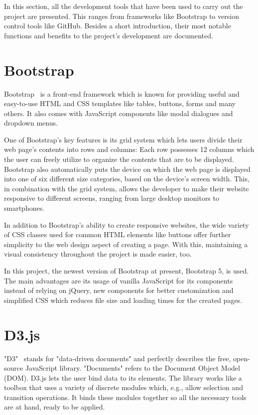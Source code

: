 
In this section, all the development tools that have been used to carry out the project are presented. This ranges from frameworks like Bootstrap to version control tools like GitHub. Besides a short introduction, their most notable functions and benefits to the project's development are documented.

\section{Bootstrap}
Bootstrap~\cite{bootstrap5_tutorial} is a front-end framework which is known for providing useful and easy-to-use HTML and CSS templates like tables, buttons, forms and many others. It also comes with JavaScript components like modal dialogues and dropdown menus.

One of Bootstrap's key features is its grid system which lets users divide their web page's contents into rows and columns:
Each row possesses 12 columns which the user can freely utilize to organize the contents that are to be displayed. Bootstrap also automatically puts the device on which the web page is displayed into one of six different size categories, based on the device's screen width. This, in combination with the grid system, allows the developer to make their website responsive to different screens, ranging from large desktop monitors to smartphones.

In addition to Bootstrap's ability to create responsive websites, the wide variety of CSS classes used for common HTML elements like buttons offer further simplicity to the web design aspect of creating a page. With this, maintaining a visual consistency throughout the project is made easier, too.

In this project, the newest version of Bootstrap at present, Bootstrap 5, is used. The main advantages are its usage of vanilla JavaScript for its components instead of relying on jQuery, new components for better customization and simplified CSS which reduces file size and loading times for the created pages.

\section{D3.js}
"D3"~\cite{d3js_what_is_d3} stands for "data-driven documents" and perfectly describes the free, open-source JavaScript library. "Documents" refers to the Document Object Model (DOM). D3.js lets the user bind data to its elements. The library works like a toolbox that uses a variety of discrete modules which, e.g., allow selection and transition operations. It binds these modules together so all the necessary tools are at hand, ready to be applied.

